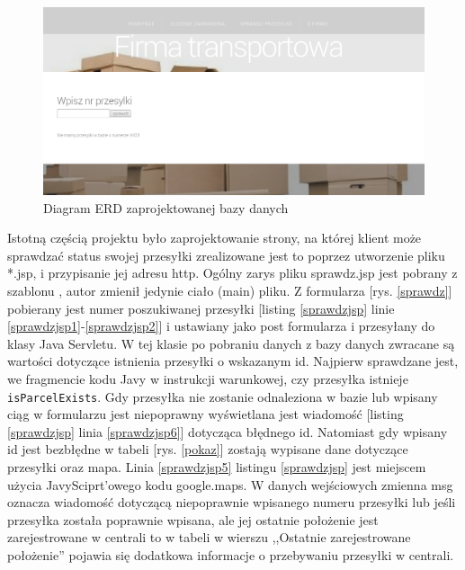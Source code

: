 \documentclass[eng,printmode,oneside]{mgr}
\begin{document}
\begin{figure}[ht!]
\centering
\includegraphics[width=90ex]{nieMaPrzesylki.png}
\caption{Diagram ERD zaprojektowanej bazy danych}
\label{niema}
\end{figure}

Istotną częścią projektu było zaprojektowanie strony, na której
klient może sprawdzać status swojej przesyłki zrealizowane jest to poprzez utworzenie pliku
*.jsp, i przypisanie jej adresu http. Ogólny zarys pliku sprawdz.jsp jest
pobrany z szablonu \cite{szablon}, autor zmienił jedynie ciało (main) pliku. Z
formularza [rys. \ref{sprawdz}] pobierany jest numer poszukiwanej przesyłki
[listing \ref{sprawdzjsp} linie \ref{sprawdzjsp1}-\ref{sprawdzjsp2}] i ustawiany jako
post formularza i przesyłany do klasy Java Servletu. W tej klasie po
pobraniu danych z bazy danych zwracane są wartości dotyczące istnienia przesyłki
o wskazanym id. Najpierw sprawdzane jest, we fragmencie kodu Javy w instrukcji
warunkowej, czy przesyłka istnieje \texttt{isParcelExists}. Gdy przesyłka
nie zostanie odnaleziona w bazie lub wpisany ciąg w formularzu jest niepoprawny
wyświetlana jest wiadomość [listing \ref{sprawdzjsp} linia \ref{sprawdzjsp6}]
dotycząca błędnego id. Natomiast gdy wpisany id jest bezbłędne w tabeli [rys.
\ref{pokaz}] zostają wypisane dane dotyczące przesyłki oraz mapa. Linia \ref{sprawdzjsp5}
listingu \ref{sprawdzjsp} jest miejscem użycia JavySciprt'owego kodu
google.maps. W danych wejściowych zmienna msg oznacza wiadomość dotyczącą
niepoprawnie wpisanego numeru przesyłki lub jeśli przesyłka została poprawnie
wpisana, ale jej ostatnie położenie jest zarejestrowane w centrali to w tabeli
w wierszu ,,Ostatnie zarejestrowane położenie'' pojawia się dodatkowa informacje
o przebywaniu przesyłki w centrali.
\end{document}
